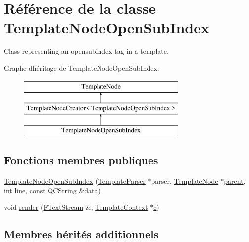 \hypertarget{class_template_node_open_sub_index}{}\section{Référence de la classe Template\+Node\+Open\+Sub\+Index}
\label{class_template_node_open_sub_index}


Class representing an \textquotesingle{}opensubindex\textquotesingle{} tag in a template.  


Graphe d\textquotesingle{}héritage de Template\+Node\+Open\+Sub\+Index\+:\begin{figure}[H]
\begin{center}
\leavevmode
\includegraphics[height=3.000000cm]{class_template_node_open_sub_index}
\end{center}
\end{figure}
\subsection*{Fonctions membres publiques}
\begin{DoxyCompactItemize}
\item 
\hyperlink{class_template_node_open_sub_index_a1a226b93fca44d7063485add66364b0b}{Template\+Node\+Open\+Sub\+Index} (\hyperlink{class_template_parser}{Template\+Parser} $\ast$parser, \hyperlink{class_template_node}{Template\+Node} $\ast$\hyperlink{class_template_node_a69a306ef84e62af9fe57bf9aacc94536}{parent}, int line, const \hyperlink{class_q_c_string}{Q\+C\+String} \&data)
\item 
void \hyperlink{class_template_node_open_sub_index_aa6b5d454dc4f96d2a21ce04b54ea0ce4}{render} (\hyperlink{class_f_text_stream}{F\+Text\+Stream} \&, \hyperlink{class_template_context}{Template\+Context} $\ast$\hyperlink{060__command__switch_8tcl_ab14f56bc3bd7680490ece4ad7815465f}{c})
\end{DoxyCompactItemize}
\subsection*{Membres hérités additionnels}


